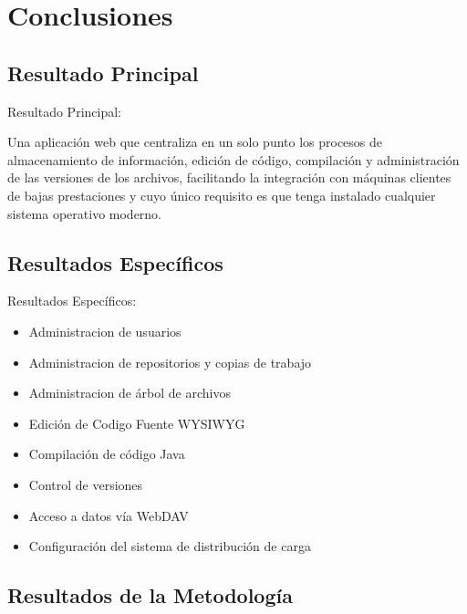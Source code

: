 \section{Conclusiones}

\subsection{Resultado Principal}

\begin{frame}{Resultado Principal:\newline}

Una aplicación web que centraliza en un solo punto los procesos de almacenamiento de información, edición de código, compilación y administración de las versiones de los archivos, facilitando la integración con máquinas clientes de bajas prestaciones y cuyo único requisito es que tenga instalado cualquier sistema operativo moderno.

\end{frame}


\subsection{Resultados Específicos}

\begin{frame}{Resultados Específicos:\newline}

\begin{itemize}
	
	\pause
	\item Administracion de usuarios
	\item Administracion de repositorios y copias de trabajo
	\item Administracion de árbol de archivos
	\item Edición de Codigo Fuente WYSIWYG
	\item Compilación de código Java
	\item Control de versiones
	\item Acceso a datos vía WebDAV
	\item Configuración del sistema de distribución de carga
	
\end{itemize}

\end{frame}


\subsection{Resultados de la Metodología}

